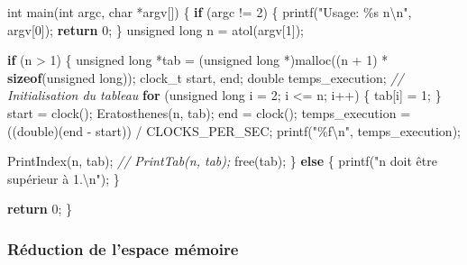 \documentclass[
]{article}
\newenvironment{Shaded}{}{}
\newcommand{\CommentTok}[1]{\textcolor[rgb]{0.38,0.63,0.69}{\textit{#1}}}
\newcommand{\ControlFlowTok}[1]{\textcolor[rgb]{0.00,0.44,0.13}{\textbf{#1}}}
\newcommand{\DataTypeTok}[1]{\textcolor[rgb]{0.56,0.13,0.00}{#1}}
\newcommand{\DecValTok}[1]{\textcolor[rgb]{0.25,0.63,0.44}{#1}}
\newcommand{\KeywordTok}[1]{\textcolor[rgb]{0.00,0.44,0.13}{\textbf{#1}}}
\newcommand{\NormalTok}[1]{#1}
\newcommand{\SpecialCharTok}[1]{\textcolor[rgb]{0.25,0.44,0.63}{#1}}
\newcommand{\StringTok}[1]{\textcolor[rgb]{0.25,0.44,0.63}{#1}}
\begin{document}
\begin{Shaded}
\begin{Highlighting}[]
\DataTypeTok{int}\NormalTok{ main(}\DataTypeTok{int}\NormalTok{ argc, }\DataTypeTok{char}\NormalTok{ *argv[])}
\NormalTok{\{}
    \ControlFlowTok{if}\NormalTok{ (argc != }\DecValTok{2}\NormalTok{)}
\NormalTok{    \{}
\NormalTok{        printf(}\StringTok{"Usage: \%s n}\SpecialCharTok{\textbackslash{}n}\StringTok{"}\NormalTok{, argv[}\DecValTok{0}\NormalTok{]);}
        \ControlFlowTok{return} \DecValTok{0}\NormalTok{;}
\NormalTok{    \}}
    \DataTypeTok{unsigned} \DataTypeTok{long}\NormalTok{ n = atol(argv[}\DecValTok{1}\NormalTok{]);}

    \ControlFlowTok{if}\NormalTok{ (n \textgreater{} }\DecValTok{1}\NormalTok{)}
\NormalTok{    \{}
        \DataTypeTok{unsigned} \DataTypeTok{long}\NormalTok{ *tab = (}\DataTypeTok{unsigned} \DataTypeTok{long}\NormalTok{ *)malloc((n + }\DecValTok{1}\NormalTok{) * }\KeywordTok{sizeof}\NormalTok{(}\DataTypeTok{unsigned} \DataTypeTok{long}\NormalTok{));}
\NormalTok{        clock\_t start, end;}
        \DataTypeTok{double}\NormalTok{ temps\_execution;}
        \CommentTok{// Initialisation du tableau}
        \ControlFlowTok{for}\NormalTok{ (}\DataTypeTok{unsigned} \DataTypeTok{long}\NormalTok{ i = }\DecValTok{2}\NormalTok{; i \textless{}= n; i++)}
\NormalTok{        \{}
\NormalTok{            tab[i] = }\DecValTok{1}\NormalTok{;}
\NormalTok{        \}}
\NormalTok{        start = clock();}
\NormalTok{        Eratosthenes(n, tab);}
\NormalTok{        end = clock();}
\NormalTok{        temps\_execution = ((}\DataTypeTok{double}\NormalTok{)(end {-} start)) / CLOCKS\_PER\_SEC;}
\NormalTok{        printf(}\StringTok{"\%f}\SpecialCharTok{\textbackslash{}n}\StringTok{"}\NormalTok{, temps\_execution);}

\NormalTok{        PrintIndex(n, tab);}
        \CommentTok{// PrintTab(n, tab);}
\NormalTok{        free(tab);}
\NormalTok{    \}}
    \ControlFlowTok{else}
\NormalTok{    \{}
\NormalTok{        printf(}\StringTok{"n doit être supérieur à 1.}\SpecialCharTok{\textbackslash{}n}\StringTok{"}\NormalTok{);}
\NormalTok{    \}}

    \ControlFlowTok{return} \DecValTok{0}\NormalTok{;}
\NormalTok{\}}
\end{Highlighting}
\end{Shaded}

\hypertarget{ruxe9duction-de-lespace-muxe9moire}{%
\subsubsection{Réduction de l'espace
mémoire}\label{ruxe9duction-de-lespace-muxe9moire}}
\end{document}
